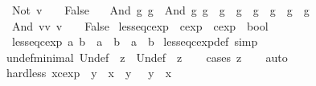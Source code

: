 \begin{isabellebody}
\ \ {\isachardoublequoteopen}{\isacharparenleft}Not\ v\ {\isacharless}\ {\isacharunderscore}{\isacharparenright}\ {\isacharequal}\ False{\isachardoublequoteclose}\ {\isacharbar}\isanewline
\isanewline
\ \ {\isachardoublequoteopen}{\isacharparenleft}And\ g{}\ g{}{\isacharparenright}\ {\isacharless}\ {\isacharparenleft}And\ g{}{\isacharprime}\ g{}{\isacharprime}{\isacharparenright}\ {\isacharequal}\ {\isacharparenleft}{\isacharparenleft}g{}\ {\isacharless}\ g{}{\isacharprime}{\isacharparenright}\ {\isasymor}\ {\isacharparenleft}{\isacharparenleft}g{}\ {\isacharequal}\ g{}{\isacharprime}{\isacharparenright}\ {\isasymand}\ {\isacharparenleft}g{}\ {\isacharless}\ g{}{\isacharprime}{\isacharparenright}{\isacharparenright}{\isacharparenright}{\isachardoublequoteclose}\ {\isacharbar}\isanewline
\ \ {\isachardoublequoteopen}{\isacharparenleft}And\ vv\ v\ {\isacharless}\ {\isacharunderscore}{\isacharparenright}\ {\isacharequal}\ False{\isachardoublequoteclose}\isanewline
\isanewline
{}\isamarkupfalse%
\ less{\isacharunderscore}eq{\isacharunderscore}cexp\ {\isacharcolon}{\isacharcolon}\ {\isachardoublequoteopen}cexp\ {\isasymRightarrow}\ cexp\ {\isasymRightarrow}\ bool{\isachardoublequoteclose}\ \isanewline
\ \ {\isachardoublequoteopen}less{\isacharunderscore}eq{\isacharunderscore}cexp\ a\ b\ {\isacharequal}\ {\isacharparenleft}a\ {\isacharless}\ b\ {\isasymor}\ a\ {\isacharequal}\ b{\isacharparenright}{\isachardoublequoteclose}\isanewline
{}\isamarkupfalse%
\ less{\isacharunderscore}eq{\isacharunderscore}cexp{\isacharunderscore}def\ {\isacharbrackleft}simp{\isacharbrackright}\isanewline
\isanewline
{}\isamarkupfalse%
\ undef{\isacharunderscore}minimal{\isacharcolon}\ {\isachardoublequoteopen}Undef\ {\isasymnoteq}\ z\ {\isasymLongrightarrow}\ Undef\ {\isacharless}\ z{\isachardoublequoteclose}\isanewline
%
\isadelimproof
\ \ %
\endisadelimproof
%
\isatagproof
{}\isamarkupfalse%
\ {\isacharparenleft}cases\ z{\isacharparenright}\isanewline
\ \ \isamarkupfalse%
\ auto%
\endisatagproof
{\isafoldproof}%
%
\isadelimproof
\isanewline
%
\endisadelimproof
\isanewline
{}\isamarkupfalse%
\ hard{\isacharunderscore}less{\isacharcolon}\ {\isachardoublequoteopen}{\isacharparenleft}{\isacharparenleft}x{\isacharcolon}{\isacharcolon}cexp{\isacharparenright}\ {\isacharless}\ y{\isacharparenright}\ {\isacharequal}\ {\isacharparenleft}x\ {\isasymle}\ y\ {\isasymand}\ {\isasymnot}\ y\ {\isasymle}\ x{\isacharparenright}{\isachardoublequoteclose}\isanewline

\end{isabellebody}
